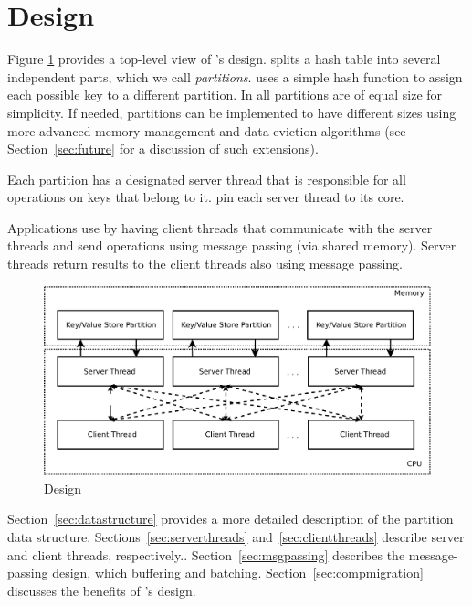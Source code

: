 \section{\cphash{} Design}
\label{sec:design}

Figure \ref{fig:mcstore} provides a top-level view of \cphash{}'s design.
\cphash{} splits a hash table into several independent parts, which we call
\textit{partitions}. \cphash{} uses a simple hash function to assign each
possible key to a different partition. In \cphash{} all partitions are of equal
size for simplicity. If needed, partitions can be implemented to have different
sizes using more advanced memory management and data eviction algorithms (see
Section~\ref{sec:future} for a discussion of such extensions).

Each partition has a designated server thread that is responsible for all
operations on keys that belong to it. \cphash{} pin each server thread to its
core.

Applications use \cphash{} by having client threads that communicate with the
server threads and send operations using message passing (via shared
memory). Server threads return results to the client threads also using message
passing.

\begin{figure}[t]
  \centering
  \includegraphics[width=\linewidth]{figs/mcstore.pdf}
  \caption{\cphash{} Design}
  \label{fig:mcstore}
\end{figure}

  
Section~\ref{sec:datastructure} provides a more detailed description of the
partition data structure.  Sections~\ref{sec:serverthreads}
and~\ref{sec:clientthreads} describe server and client threads, respectively..
Section~\ref{sec:msgpassing} describes the message- passing design, which
buffering and batching.  Section~\ref{sec:compmigration} discusses the benefits
of \cphash{}'s design.

